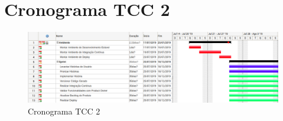 \section{Cronograma TCC 2}

\begin{figure}[H]
	\centering
	\includegraphics[width=1.1\textwidth]{figuras/cronograma.png}
	\caption{Cronograma TCC 2}
	\label{img:cronograma}
\end{figure}